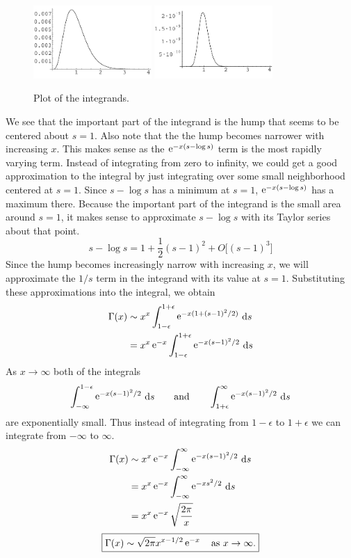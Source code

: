 \begin{figure}[h!]
  \begin{center}
    \includegraphics[width=0.4\textwidth]{ode/gamma/intgam5}
    \includegraphics[width=0.4\textwidth]{ode/gamma/intgam20}
  \end{center}
  \caption{Plot of the integrands.}
  \label{int_gamma520}
\end{figure}





We see that the important part of the integrand is the hump that seems to be 
centered about $s = 1$.  Also note that the the hump becomes narrower with
increasing $x$.  This makes sense as the $\mathop{\mathrm{e}}\nolimits^{-x (s - \log s)}$ term is the most
rapidly varying term.  
Instead of integrating from zero to infinity, we could get a good approximation
to the integral by just integrating over some small neighborhood centered
at $s = 1$.
Since $s - \log s$ has a minimum at $s = 1$, 
$\mathop{\mathrm{e}}\nolimits^{-x (s - \log s)}$ has a maximum there.  Because the important part of the 
integrand is the small area around $s = 1$, it makes sense to approximate
$s - \log s$ with its Taylor series about that point.
\[ s - \log s = 1 + \frac{1}{2} (s - 1)^2 + O\big[(s-1)^3\big] \]
Since the hump becomes increasingly narrow with increasing $x$, we will 
approximate the $1/s$ term in the integrand with its value at $s = 1$.
Substituting these approximations into the integral, we obtain
\begin{align*}
  \Gamma(x) &\sim x^x \int_{1-\epsilon}^{1+\epsilon}
  \mathop{\mathrm{e}}\nolimits^{-x (1 + (s-1)^2 / 2)}\,\mathrm{d} s \\
  &= x^x \mathop{\mathrm{e}}\nolimits^{-x} \int_{1-\epsilon}^{1+\epsilon}
  \mathop{\mathrm{e}}\nolimits^{-x (s-1)^2/2}\,\mathrm{d} s 
\end{align*}
As $x \to \infty$ both of the integrals
\[ \int_{-\infty}^{1-\epsilon} \mathop{\mathrm{e}}\nolimits^{-x (s-1)^2/2}\,\mathrm{d} s \qquad \mathrm{and} \qquad
\int_{1+\epsilon}^{\infty} \mathop{\mathrm{e}}\nolimits^{-x (s-1)^2/2}\,\mathrm{d} s \]
are exponentially small.  Thus instead of integrating from $1-\epsilon$ to
$1 + \epsilon$ we can integrate from $-\infty$ to $\infty$.
\begin{align*}
  \Gamma(x) &\sim x^x \mathop{\mathrm{e}}\nolimits^{-x} \int_{-\infty}^\infty \mathop{\mathrm{e}}\nolimits^{-x (s-1)^2/2}\,\mathrm{d} s \\
  &= x^x \mathop{\mathrm{e}}\nolimits^{-x} \int_{-\infty}^\infty \mathop{\mathrm{e}}\nolimits^{-x s^2 / 2}\,\mathrm{d} s \\
  &= x^x \mathop{\mathrm{e}}\nolimits^{-x} \sqrt{\frac{2\pi}{x}}
\end{align*}
\[ \boxed{ \Gamma(x) \sim \sqrt{2 \pi} x^{x-1/2} \mathop{\mathrm{e}}\nolimits^{-x} \quad
  \mathrm{as}\ x \to \infty. } \]

